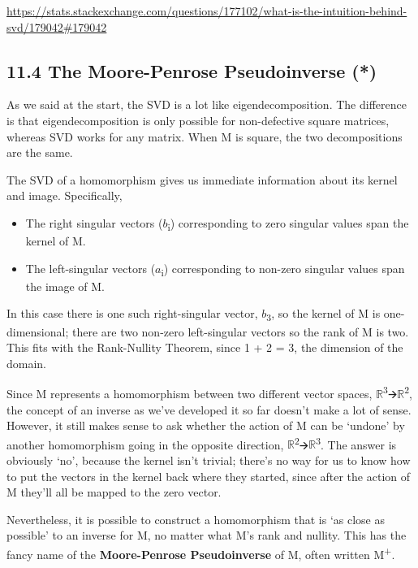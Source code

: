 \documentclass[oneside,english]{amsbook}
\numberwithin{section}{chapter}
\theoremstyle{plain}
\theoremstyle{definition}
\begin{document}
\url{https://stats.stackexchange.com/questions/177102/what-is-the-intuition-behind-svd/179042\#179042}

\subsection{11.4 The Moore-Penrose Pseudoinverse
	(*)}\label{the-moore-penrose-pseudoinverse}

As we said at the start, the SVD is a lot like eigendecomposition. The
difference is that eigendecomposition is only possible for non-defective
square matrices, whereas SVD works for any matrix. When M is square, the
two decompositions are the same.

The SVD of a homomorphism gives us immediate information about its
kernel and image. Specifically,

\begin{itemize}
	\item
	The right singular vectors ($b$\textsubscript{i}) corresponding to
	zero singular values span the kernel of M.
	\item
	The left-singular vectors ($a$\textsubscript{i}) corresponding to
	non-zero singular values span the image of M.
\end{itemize}

In this case there is one such right-singular vector,
$b$\textsubscript{3}, so the kernel of M is one-dimensional; there
are two non-zero left-singular vectors so the rank of M is two. This
fits with the Rank-Nullity Theorem, since 1 + 2 = 3, the dimension of
the domain.

Since M represents a homomorphism between two different vector spaces,
$\mathbb{R}$\textsuperscript{3}🡪$\mathbb{R}$\textsuperscript{2}, the concept
of an inverse as we've developed it so far doesn't make a lot of sense.
However, it still makes sense to ask whether the action of M can be
`undone' by another homomorphism going in the opposite direction,
$\mathbb{R}$\textsuperscript{2}🡪$\mathbb{R}$\textsuperscript{3}. The answer
is obviously `no', because the kernel isn't trivial; there's no way
for us to know how to put the vectors in the kernel back where they
started, since after the action of M they'll all be mapped to the zero
vector.

Nevertheless, it is possible to construct a homomorphism that is `as
close as possible' to an inverse for M, no matter what M's rank and
nullity. This has the fancy name of the \textbf{Moore-Penrose
	Pseudoinverse} of M, often written M\textsuperscript{+}.
\end{document}
